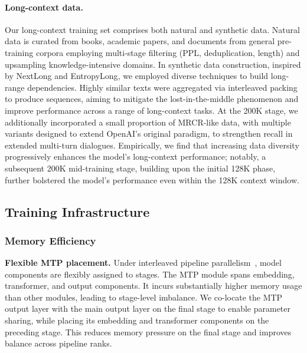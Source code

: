 \paragraph{Long-context data.} Our long-context training set comprises both natural and synthetic data. Natural data is curated from books, academic papers, and documents from general pre-training corpora employing multi-stage filtering (PPL, deduplication, length) and upsampling knowledge-intensive domains. In synthetic data construction, inspired by NextLong\cite{gao2025nextlongeffectivelongcontexttraining} and EntropyLong\cite{jia2025entropylongeffectivelongcontexttraining}, we employed diverse techniques to build long-range dependencies. Highly similar texts were aggregated via interleaved packing to produce sequences, aiming to mitigate the lost-in-the-middle phenomenon and improve performance across a range of long-context tasks. At the 200K stage, we additionally incorporated a small proportion of MRCR-like data, with multiple variants designed to extend OpenAI's original paradigm, to strengthen recall in extended multi-turn dialogues. Empirically, we find that increasing data diversity progressively enhances the model's long-context performance; notably, a subsequent 200K mid-training stage, building upon the initial 128K phase, further bolstered the model’s performance even within the 128K context window.

\subsection{Training Infrastructure}

\subsubsection{Memory Efficiency}

\textbf{Flexible MTP placement.} Under interleaved pipeline parallelism~\cite{narayanan2021efficientlargescalelanguagemodel}, model components are flexibly assigned to stages. The MTP module spans embedding, transformer, and output components. It incurs substantially higher memory usage than other modules, leading to stage-level imbalance. We co-locate the MTP output layer with the main output layer on the final stage to enable parameter sharing, while placing its embedding and transformer components on the preceding stage. This reduces memory pressure on the final stage and improves balance across pipeline ranks.

